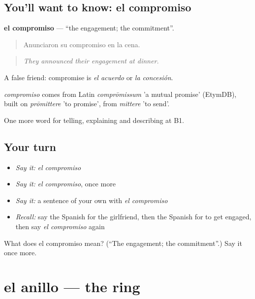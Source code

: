 \subsection*{You'll want to know: el compromiso}
\textbf{el compromiso} — \textquotedblleft{}the engagement; the commitment\textquotedblright{}.

\begin{quote}
Anunciaron su compromiso en la cena.
\end{quote}

\begin{quote}
\emph{They announced their engagement at dinner.}
\end{quote}

A false friend: compromise is \emph{el acuerdo} or \emph{la concesión}.

\begin{cousinweb}
\emph{compromiso} comes from Latin \emph{comprōmissum} 'a mutual promise' (EtymDB), built on \emph{prōmittere} 'to promise', from \emph{mittere} 'to send'.
\end{cousinweb}

\begin{grammarlens}[title={What you've built}]
One more word for telling, explaining and describing at B1.
\end{grammarlens}

\subsection*{Your turn}
\begin{itemize}
\raggedright
  \item \emph{Say it:} \emph{el compromiso}
  \item \emph{Say it:} \emph{el compromiso}, once more
  \item \emph{Say it:} a sentence of your own with \emph{el compromiso}
  \item \emph{Recall:} say the Spanish for the girlfriend, then the Spanish for to get engaged, then say \emph{el compromiso} again
\end{itemize}

\begin{tcolorbox}[breakable,colback=teal!4,colframe=teal!35!black,title={Before you move on}]
What does el compromiso mean? (\textquotedblleft{}The engagement; the commitment\textquotedblright{}.) Say it once more.
\end{tcolorbox}
\section[el anillo]{el anillo — the ring}

